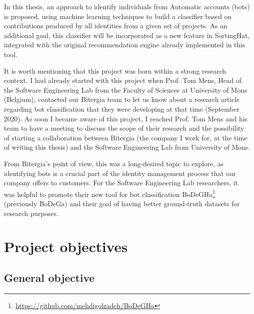 \documentclass[a4paper, 12pt]{book}
\begin{document}
In this thesis, an approach to identify individuals from Automatic accounts (bots) is proposed, using machine learning techniques to build a classifier based on contributions produced by all identities from a given set of projects. As an additional goal, this classifier will be incorporated as a new feature in SortingHat, integrated with the original recommendation engine already implemented in this tool.

It is worth mentioning that this project was born within a strong research context. I had already started with this project when Prof. Tom Mens, Head of the Software Engineering Lab from the Faculty of Sciences at University of Mons (Belgium), contacted our Bitergia team to let us know about a research article regarding bot classification that they were developing at that time (September 2020). As soon I became aware of this project, I reached Prof. Tom Mens and his team to have a meeting to discuss the scope of their research and the possibility of starting a collaboration between Bitergia (the company I work for, at the time of writing this thesis) and the Software Engineering Lab from University of Mons. 

From Bitergia's point of view, this was a long-desired topic to explore, as identifying bots is a crucial part of the identity management process that our company offers to customers. For the Software Engineering Lab researchers, it was helpful to promote their new tool for bot classification BoDeGHa\footnote{\url{https://github.com/mehdigolzadeh/BoDeGHa}} (previously BoDeGa) and their goal of having better ground-truth datasets for research purposes.



\section{Project objectives}
\label{sec:objectives}

\subsection{General objective} %
\label{ssec:general-objective} %
\end{document}
